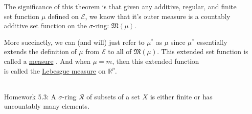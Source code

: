 \documentclass{book}
\newcommand{\exOne}{%
   \color{Purple}%
   \fontsize{14}{16}\selectfont%
}
\newcommand{\udefine}[1]{{%
   \setulcolor{Red}%
   \setul{0.14em}{0.07em}%
   \ul{#1}%
}}
\newcommand{\mySepTwo}[1][.]{%
   {\noindent\color{#1}{\rule{6.5in}{0.5mm}}}\\%
}
\newcommand{\retTwo}{\hfill\bigbreak}
\begin{document}
The significance of this theorem is that given any additive, regular, and finite\\ set function $\mu$ defined on $\mathcal{E}$, we know that it's outer measure is a countably\\ additive set function on the $\sigma$-ring: $\mathfrak{M}(\mu)$.\retTwo

More succinctly, we can (and will) just refer to $\mu^*$ as $\mu$ since $\mu^*$ essentially\\ extends the definition of $\mu$ from $\mathcal{E}$ to all of $\mathfrak{M}(\mu)$. This extended set function is\\ called a \udefine{measure}. And when $\mu = m$, then this extended function\\ is  called the \udefine{Lebesgue measure} on $\mathbb{R}^p$.\retTwo

\exOne
\mySepTwo

Homework 5.3: A $\sigma$-ring $\mathcal{R}$ of subsets of a set $X$ is either finite or has\\ uncountably many elements.
\end{document}

